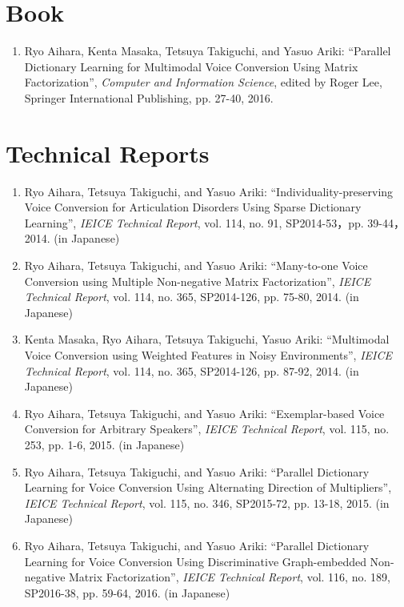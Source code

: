 \section*{Book}
\begin{enumerate}

\item Ryo Aihara, Kenta Masaka, Tetsuya Takiguchi, and Yasuo Ariki:
``Parallel Dictionary Learning for Multimodal Voice Conversion Using Matrix Factorization'',
\textit{Computer and Information Science}, edited by Roger Lee, Springer International Publishing, pp. 27-40, 2016.

\end{enumerate}

\section*{Technical Reports}
\begin{enumerate}

\item Ryo Aihara, Tetsuya Takiguchi, and Yasuo Ariki:
``Individuality-preserving Voice Conversion for Articulation Disorders Using Sparse Dictionary Learning'',
\textit{IEICE Technical Report}, vol. 114, no. 91, SP2014-53，pp. 39-44，2014. (in Japanese)

\item Ryo Aihara, Tetsuya Takiguchi, and Yasuo Ariki:
``Many-to-one Voice Conversion using Multiple Non-negative Matrix Factorization'',
\textit{IEICE Technical Report}, vol. 114, no. 365, SP2014-126, pp. 75-80, 2014. (in Japanese)

\item Kenta Masaka, Ryo Aihara, Tetsuya Takiguchi, Yasuo Ariki:
``Multimodal Voice Conversion using Weighted Features in Noisy Environments'',
\textit{IEICE Technical Report}, vol. 114, no. 365, SP2014-126, pp. 87-92, 2014. (in Japanese)

\item Ryo Aihara, Tetsuya Takiguchi, and Yasuo Ariki:
``Exemplar-based Voice Conversion for Arbitrary Speakers'',
\textit{IEICE Technical Report}, vol. 115, no. 253, pp. 1-6, 2015. (in Japanese)

\item Ryo Aihara, Tetsuya Takiguchi, and Yasuo Ariki:
``Parallel Dictionary Learning for Voice Conversion Using Alternating Direction of Multipliers'',
\textit{IEICE Technical Report}, vol. 115, no. 346, SP2015-72, pp. 13-18, 2015. (in Japanese)

\item Ryo Aihara, Tetsuya Takiguchi, and Yasuo Ariki:
``Parallel Dictionary Learning for Voice Conversion Using Discriminative Graph-embedded Non-negative Matrix Factorization'',
\textit{IEICE Technical Report}, vol. 116, no. 189, SP2016-38, pp. 59-64, 2016. (in Japanese)

\end{enumerate}

